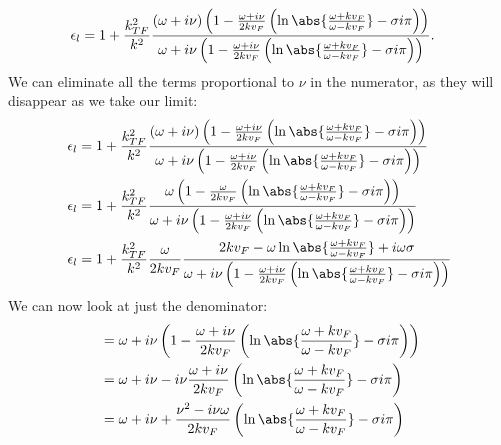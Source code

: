 \documentclass[../../main.tex]{subfiles}
\newcommand{\vf}{v_F}
\begin{document}
\begin{align} 
 \epsilon_l &= 1 + \frac{k_{TF}^2}{k^2} \frac{\left(\omega + i \nu \right) \left( 1 - \frac{\omega + i \nu}{2 k\vf} \left(\ln\abs{\frac{\omega + k\vf}{\omega - k\vf}} - \sigma i \pi\right)\right)}{\omega + i \nu\left( 1 - \frac{\omega + i \nu}{2 k\vf} \left(\ln\abs{\frac{\omega + k\vf}{\omega - k\vf}} - \sigma i \pi\right)\right)}.
\end{align}
We can eliminate all the terms proportional to $\nu$ in the numerator, as they will disappear as we take our limit:
\begin{align}
	\epsilon_l &= 1 + \frac{k_{TF}^2}{k^2} \frac{\left(\omega + i \nu \right) \left( 1 - \frac{\omega + i \nu}{2 k\vf} \left(\ln\abs{\frac{\omega + k\vf}{\omega - k\vf}} - \sigma i \pi\right)\right)}{\omega + i \nu\left( 1 - \frac{\omega + i \nu}{2 k\vf} \left(\ln\abs{\frac{\omega + k\vf}{\omega - k\vf}} - \sigma i \pi\right)\right)} \\
	\epsilon_l &= 1 + \frac{k_{TF}^2}{k^2} \frac{\omega \left( 1 - \frac{\omega}{2 k\vf} \left(\ln\abs{\frac{\omega + k\vf}{\omega - k\vf}} - \sigma i \pi\right)\right)}{\omega + i \nu\left( 1 - \frac{\omega + i \nu}{2 k\vf} \left(\ln\abs{\frac{\omega + k\vf}{\omega - k\vf}} - \sigma i \pi\right)\right)} \\
	\epsilon_l &= 1 + \frac{k_{TF}^2}{k^2} \frac{\omega}{2 k \vf} \frac{ 2 k\vf - \omega \ln\abs{\frac{\omega + k\vf}{\omega - k\vf}} + i \omega \sigma}{\omega + i \nu\left( 1 - \frac{\omega + i \nu}{2 k\vf} \left(\ln\abs{\frac{\omega + k\vf}{\omega - k\vf}} - \sigma i \pi\right)\right)} 
\end{align}
We can now look at just the denominator:
\begin{align}
	&= \omega + i \nu\left( 1 - \frac{\omega + i \nu}{2 k\vf} \left(\ln\abs{\frac{\omega + k\vf}{\omega - k\vf}} - \sigma i \pi\right)\right) \\
	&= \omega + i \nu - i\nu\frac{\omega + i \nu}{2 k\vf} \left(\ln\abs{\frac{\omega + k\vf}{\omega - k\vf}} - \sigma i \pi\right) \\
	&= \omega + i \nu + \frac{\nu^2 - i \nu \omega}{2 k \vf}  \left(\ln\abs{\frac{\omega + k\vf}{\omega - k\vf}} - \sigma i \pi\right)
\end{align}
 
\end{document}
